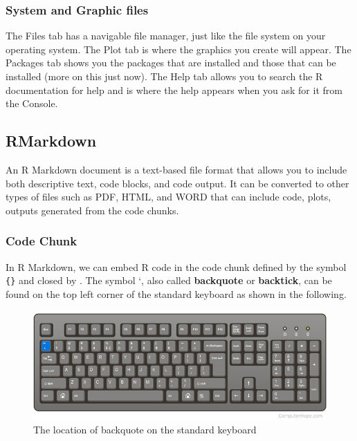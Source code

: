 \documentclass[
]{book}
\begin{document}
\hypertarget{system-and-graphic-files}{%
\subsubsection{System and Graphic files}\label{system-and-graphic-files}}

The Files tab has a navigable file manager, just like the file system on your operating system. The Plot tab is where the graphics you create will appear. The Packages tab shows you the packages that are installed and those that can be installed (more on this just now). The Help tab allows you to search the R documentation for help and is where the help appears when you ask for it from the Console.

\hypertarget{rmarkdown}{%
\subsection{RMarkdown}\label{rmarkdown}}

An R Markdown document is a text-based file format that allows you to include both descriptive text, code blocks, and code output. It can be converted to other types of files such as PDF, HTML, and WORD that can include code, plots, outputs generated from the code chunks.

\hypertarget{code-chunk}{%
\subsubsection{Code Chunk}\label{code-chunk}}

In R Markdown, we can embed R code in the code chunk defined by the symbol \texttt{\textasciigrave{}\textasciigrave{}\textasciigrave{}\{\}} and closed by \texttt{\textasciigrave{}\textasciigrave{}\textasciigrave{}}. The symbol \texttt{} `, also called \textbf{backquote} or \textbf{backtick}, can be found on the top left corner of the standard keyboard as shown in the following.

\begin{figure}

{\centering \includegraphics[width=0.6\linewidth]{img00/Key4CodeChunk} 

}

\caption{The location of backquote on the standard keyboard}\label{fig:unnamed-chunk-4}
\end{figure}
\end{document}
